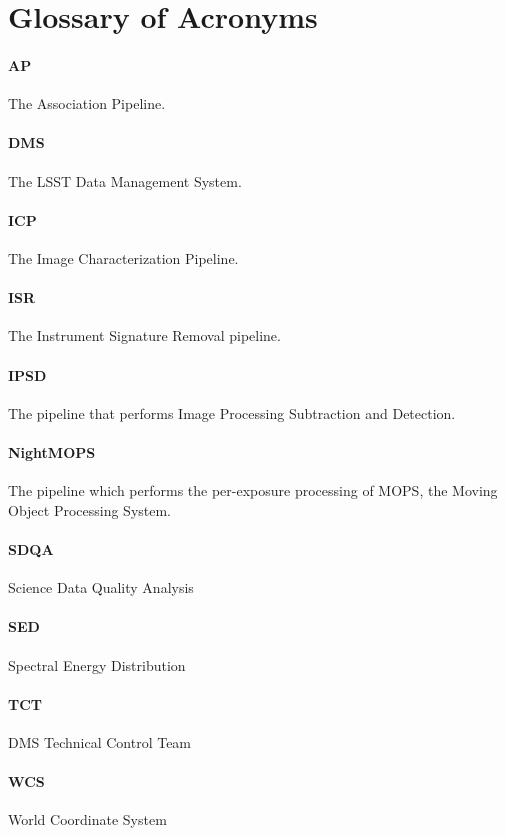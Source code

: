 \section{Glossary of Acronyms}

\paragraph{AP}
The Association Pipeline.

\paragraph{DMS}
The LSST Data Management System.

\paragraph{ICP}
The Image Characterization Pipeline.

\paragraph{ISR}
The Instrument Signature Removal pipeline.

\paragraph{IPSD}
The pipeline that performs Image Processing Subtraction and Detection.

\paragraph{NightMOPS}
The pipeline which performs the per-exposure processing of MOPS, the
Moving Object Processing System.

\paragraph{SDQA}
Science Data Quality Analysis

\paragraph{SED}
Spectral Energy Distribution

\paragraph{TCT}
DMS Technical Control Team

\paragraph{WCS}
World Coordinate System
